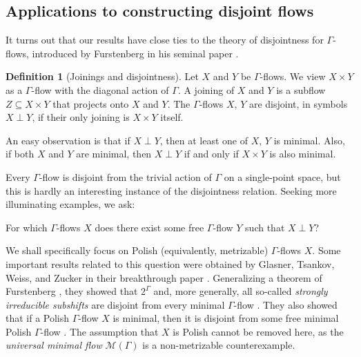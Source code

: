 \documentclass[11pt,reqno,psamsfonts]{amsart}
\theoremstyle{bfnote}
\theoremstyle{definition}
\newtheorem{defn}[theo]{Definition}
\theoremstyle{remark}
\newcommand{\0}{\varnothing}
\newcommand{\emphd}[1]{{\fontseries{b}\selectfont\textsf{#1}}}
\newcommand{\G}{\Gamma}
\numberwithin{equation}{section}
\begin{document}
    \subsection{Applications to constructing disjoint flows}

    It turns out that our results have close ties to the theory of {disjointness} for $\G$-flows, introduced by Furstenberg in his seminal paper \cite{Furstenberg}. 

    \begin{defn}[Joinings and disjointness]
        Let $X$ and $Y$ be $\G$-flows. We view $X \times Y$ as a $\G$-flow with the diagonal action of $\G$. A \emphd{joining} of $X$ and $Y$ is a subflow $Z \subseteq X \times Y$ that projects onto $X$ and $Y$. The $\G$-flows $X$, $Y$ are \emphd{disjoint}, in symbols $X \perp Y$, if their only joining is $X \times Y$ itself.
    \end{defn}

    An easy observation is that if $X \perp Y$, then at least one of $X$, $Y$ is minimal. Also, if both $X$ and $Y$ are minimal, then $X \perp Y$ if and only if $X \times Y$ is also minimal.

    Every $\G$-flow is disjoint from the trivial action of $\G$ on a single-point space, but this is hardly an interesting instance of the disjointness relation. Seeking more illuminating examples, we ask: %

    \begin{tcolorbox}[width=\linewidth, sharp corners=all, colback=white!95!black, boxrule=0pt,colframe=white] 
        For which $\G$-flows $X$ does there exist some free $\G$-flow $Y$ such that $X \perp Y$?
    \end{tcolorbox}

    We shall specifically focus on {Polish} (equivalently, metrizable) $\G$-flows $X$. Some important results related to this question were obtained by Glasner, Tsankov, Weiss, and Zucker in their breakthrough paper \cite{BernoulliDisjointness}. Generalizing a theorem of Furstenberg \cite{Furstenberg}, they showed that $2^\G$ and, more generally, all so-called \emph{strongly irreducible subshifts} are disjoint from every minimal $\G$-flow \cite[Thm.~6.2]{BernoulliDisjointness}. They also showed that if a Polish $\G$-flow $X$ is minimal, then it is disjoint from some free minimal Polish $\G$-flow \cite[Thm.~1.2(i)]{BernoulliDisjointness}. The assumption that $X$ is Polish cannot be removed here, as the \emph{universal minimal flow} $\mathcal{M}(\G)$ is a non-metrizable counterexample. 
    
\end{document}
